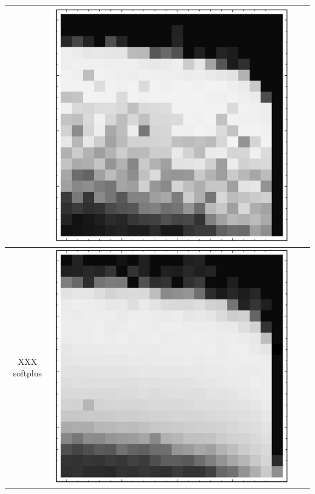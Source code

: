 \documentclass[10pt]{article}
\begin{document}
\begin{tabular}{|c|c|c|c|}
        & \includegraphics[scale=0.25]{plots/simple/LF-40R20R10R-20T10-MNIST-6.eps} \\ \hline
XXX softplus 
        & \includegraphics[scale=0.25]{plots/simple/LF-20B10B-20T10-MNIST-6.eps}

\end{tabular}
\end{document}
